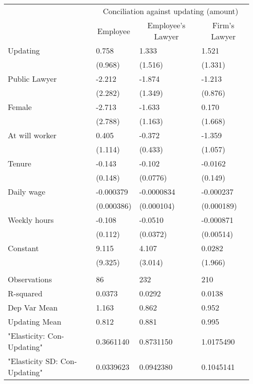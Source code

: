 \begin{tabular}{llll}
      & \multicolumn{3}{c}{Conciliation against updating (amount)} \\
\cmidrule{2-4}      & \multicolumn{1}{c}{Employee} & \multicolumn{1}{c}{Employee's Lawyer} & \multicolumn{1}{c}{Firm's Lawyer} \\
\cmidrule{2-4}Updating & 0.758 & 1.333 & 1.521 \\
      & (0.968) & (1.516) & (1.331) \\
Public Lawyer & -2.212 & -1.874 & -1.213 \\
      & (2.282) & (1.349) & (0.876) \\
Female & -2.713 & -1.633 & 0.170 \\
      & (2.788) & (1.163) & (1.668) \\
At will worker & 0.405 & -0.372 & -1.359 \\
      & (1.114) & (0.433) & (1.057) \\
Tenure & -0.143 & -0.102 & -0.0162 \\
      & (0.148) & (0.0776) & (0.149) \\
Daily wage & -0.000379 & -0.0000834 & -0.000237 \\
      & (0.000386) & (0.000104) & (0.000189) \\
Weekly hours & -0.108 & -0.0510 & -0.000871 \\
      & (0.112) & (0.0372) & (0.00514) \\
Constant & 9.115 & 4.107 & 0.0282 \\
      & (9.325) & (3.014) & (1.966) \\
      &       &       &  \\
\midrule
Observations & 86    & 232   & 210 \\
R-squared & 0.0373 & 0.0292 & 0.0138 \\
Dep Var Mean & 1.163 & 0.862 & 0.952 \\
Updating Mean & 0.812 & 0.881 & 0.995 \\
"Elasticity: Con-Updating" & 0.3661140 & 0.8731150 & 1.0175490 \\
"Elasticity SD: Con-Updating" & 0.0339623 & 0.0942380 & 0.1045141 \\
\bottomrule
\end{tabular}%
